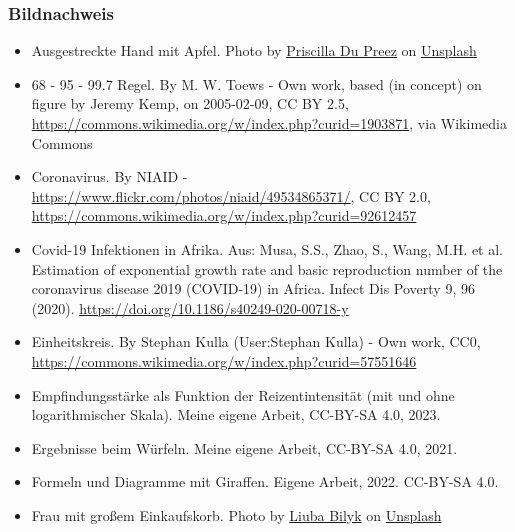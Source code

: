 \documentclass{beamer}
\begin{document}
\begin{frame}
\frametitle{Bildnachweis}


\begin{tiny}
 
\begin{itemize}

\item
Ausgestreckte Hand mit Apfel. Photo by \href{https://unsplash.com/@priscilladupreez?utm_source=unsplash&utm_medium=referral&utm_content=creditCopyText}{Priscilla Du Preez} on \href{https://unsplash.com/s/photos/apple?utm_source=unsplash&utm_medium=referral&utm_content=creditCopyText}{Unsplash}


\item
 68 - 95 - 99.7 Regel. By M. W. Toews - Own work, based (in concept) on figure by Jeremy Kemp, on 2005-02-09, CC BY 2.5, \url{https://commons.wikimedia.org/w/index.php?curid=1903871}, via Wikimedia Commons


\item
Coronavirus. By NIAID - \url{https://www.flickr.com/photos/niaid/49534865371/}, CC BY 2.0, \url{https://commons.wikimedia.org/w/index.php?curid=92612457}
\item
Covid-19 Infektionen in Afrika. Aus: Musa, S.S., Zhao, S., Wang, M.H. et al. Estimation of exponential growth rate and basic reproduction number of the coronavirus disease 2019 (COVID-19) in Africa. Infect Dis Poverty 9, 96 (2020). \url{https://doi.org/10.1186/s40249-020-00718-y}



\item
Einheitskreis. By Stephan Kulla (User:Stephan Kulla) - Own work, CC0, \url{https://commons.wikimedia.org/w/index.php?curid=57551646}

\item
Empfindungsstärke als Funktion der Reizentintensität (mit und ohne logarithmischer Skala). Meine eigene Arbeit, CC-BY-SA 4.0, 2023.


\item
Ergebnisse beim Würfeln. Meine eigene Arbeit, CC-BY-SA 4.0, 2021.

\item

Formeln und Diagramme mit Giraffen. Eigene Arbeit, 2022. CC-BY-SA 4.0.

\item 
Frau mit großem Einkaufskorb. Photo by \href{https://unsplash.com/@ibilyk?utm_source=unsplash&utm_medium=referral&utm_content=creditCopyText}{Liuba Bilyk} on \href{https://unsplash.com/s/photos/carrying-groceries?utm_source=unsplash&utm_medium=referral&utm_content=creditCopyText}{Unsplash}



\end{itemize}
\end{tiny}
\end{frame}
\end{document}
